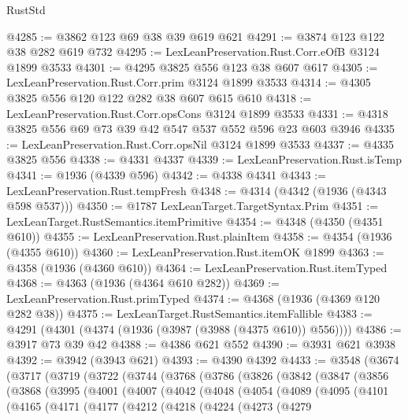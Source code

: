 \begin{lexlean}{RustStd}
\begin{coremodule}
@4285 := @3862 @123 @69 @38 @39 @619 @621
@4291 := @3874 @123 @122 @38 @282 @619 @732
@4295 := LexLeanPreservation.Rust.Corr.eOfB @3124 @1899 @3533
@4301 := @4295 @3825 @556 @123 @38 @607 @617
@4305 := LexLeanPreservation.Rust.Corr.prim @3124 @1899 @3533
@4314 := @4305 @3825 @556 @120 @122 @282 @38 @607 @615 @610
@4318 := LexLeanPreservation.Rust.Corr.opsCons @3124 @1899 @3533
@4331 := @4318 @3825 @556 @69 @73 @39 @42 @547 @537 @552 @596 @23 @603 @3946
@4335 := LexLeanPreservation.Rust.Corr.opsNil @3124 @1899 @3533
@4337 := @4335 @3825 @556
@4338 := @4331 @4337
@4339 := LexLeanPreservation.Rust.isTemp
@4341 := @1936 (@4339 @596)
@4342 := @4338 @4341
@4343 := LexLeanPreservation.Rust.tempFresh
@4348 := @4314 (@4342 (@1936 (@4343 @598 @537)))
@4350 := @1787 LexLeanTarget.TargetSyntax.Prim
@4351 := LexLeanTarget.RustSemantics.itemPrimitive
@4354 := @4348 (@4350 (@4351 @610))
@4355 := LexLeanPreservation.Rust.plainItem
@4358 := @4354 (@1936 (@4355 @610))
@4360 := LexLeanPreservation.Rust.itemOK @1899
@4363 := @4358 (@1936 (@4360 @610))
@4364 := LexLeanPreservation.Rust.itemTyped
@4368 := @4363 (@1936 (@4364 @610 @282))
@4369 := LexLeanPreservation.Rust.primTyped
@4374 := @4368 (@1936 (@4369 @120 @282 @38))
@4375 := LexLeanTarget.RustSemantics.itemFallible
@4383 := @4291 (@4301 (@4374 (@1936 (@3987 (@3988 (@4375 @610)) @556))))
@4386 := @3917 @73 @39 @42
@4388 := @4386 @621 @552
@4390 := @3931 @621 @3938
@4392 := @3942 (@3943 @621)
@4393 := @4390 @4392
@4433 := @3548
    (@3674
      (@3717
        (@3719
          (@3722
            (@3744
              (@3768
                (@3786
                  (@3826
                    (@3842
                      (@3847
                        (@3856
                          (@3868
                            (@3995
                              (@4001
                                (@4007
                                  (@4042
                                    (@4048
                                      (@4054
                                        (@4089
                                          (@4095
                                            (@4101
                                              (@4165
                                                (@4171
                                                  (@4177
                                                    (@4212
                                                      (@4218
                                                        (@4224
                                                          (@4273
                                                            (@4279

\end{coremodule}
\end{lexlean}
